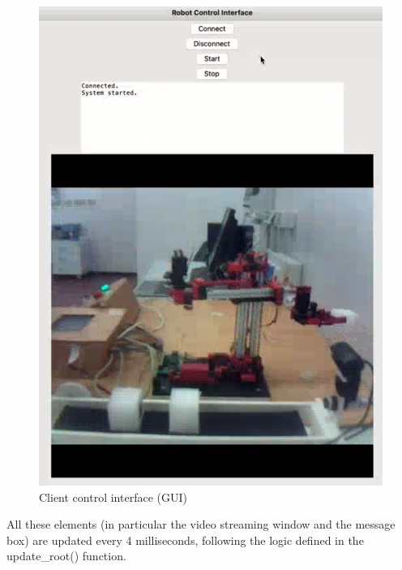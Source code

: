 \documentclass[a4paper,11pt]{report}
\theoremstyle{definition}
\theoremstyle{plain}
\begin{document}
            \begin{figure}[H]
                \includegraphics[scale=0.4]{images/interface.png}
                \centering
                \caption{Client control interface (GUI)}
            \end{figure}
            All these elements (in particular the video streaming window and the message box) are updated every 4 milliseconds, following the logic defined in the update\_root() function.
\end{document}
